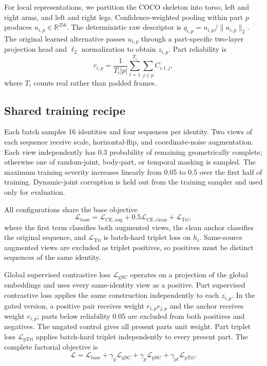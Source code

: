 \documentclass[runningheads]{llncs}
\newcommand{\R}{\mathbb{R}}
\newcommand{\Lbase}{\mathcal{L}_{\mathrm{base}}}
\newcommand{\Lglobal}{\mathcal{L}_{\mathrm{gSC}}}
\newcommand{\Lpart}{\mathcal{L}_{\mathrm{pSC}}}
\newcommand{\Lptrip}{\mathcal{L}_{\mathrm{pTri}}}
\begin{document}
For local representations, we partition the COCO skeleton into torso, left and
right arms, and left and right legs. Confidence-weighted pooling within part
$p$ produces $u_{i,p}\in\R^{256}$. The deterministic raw descriptor is
$q_{i,p}=u_{i,p}/\lVert u_{i,p}\rVert_2$. The original learned alternative
passes $u_{i,p}$ through a part-specific two-layer projection head and
$\ell_2$ normalization to obtain $z_{i,p}$. Part reliability is
\begin{equation}
 r_{i,p}=\frac{1}{T_i|p|}\sum_{t=1}^{T_i}\sum_{j\in p}C_{i,t,j},
 \label{eq:reliability}
\end{equation}
where $T_i$ counts real rather than padded frames.

\subsection{Shared training recipe}

Each batch samples 16 identities and four sequences per identity. Two views of
each sequence receive scale, horizontal-flip, and coordinate-noise augmentation.
Each view independently has 0.3 probability of remaining geometrically complete;
otherwise one of random-joint, body-part, or temporal masking is sampled. The
maximum training severity increases linearly from 0.05 to 0.5 over the first
half of training. Dynamic-joint corruption is held out from the training
sampler and used only for evaluation.

All configurations share the base objective
\begin{equation}
 \Lbase = \mathcal{L}_{\mathrm{CE,aug}}
 +0.5\mathcal{L}_{\mathrm{CE,clean}}
 +\mathcal{L}_{\mathrm{Tri}},
 \label{eq:base}
\end{equation}
where the first term classifies both augmented views, the clean anchor classifies
the original sequence, and $\mathcal{L}_{\mathrm{Tri}}$ is batch-hard triplet
loss \cite{hermans2017triplet} on $h_i$. Same-source augmented views are excluded
as triplet positives, so positives must be distinct sequences of the same
identity.

Global supervised contrastive loss $\Lglobal$ operates on a projection of the
global embeddings and uses every same-identity view as a positive. Part
supervised contrastive loss applies the same construction independently to each
$z_{i,p}$. In the gated version, a positive pair receives weight
$r_{i,p}r_{j,p}$ and the anchor receives weight $r_{i,p}$; parts below reliability
0.05 are excluded from both positives and negatives. The ungated control gives
all present parts unit weight. Part triplet loss $\Lptrip$ applies batch-hard
triplet independently to every present part. The complete factorial objective
is
\begin{equation}
 \mathcal{L}=\Lbase+\gamma_g\Lglobal+\gamma_p\Lpart+
 \gamma_{pt}\Lptrip.
 \label{eq:factorial}
\end{equation}
\end{document}
